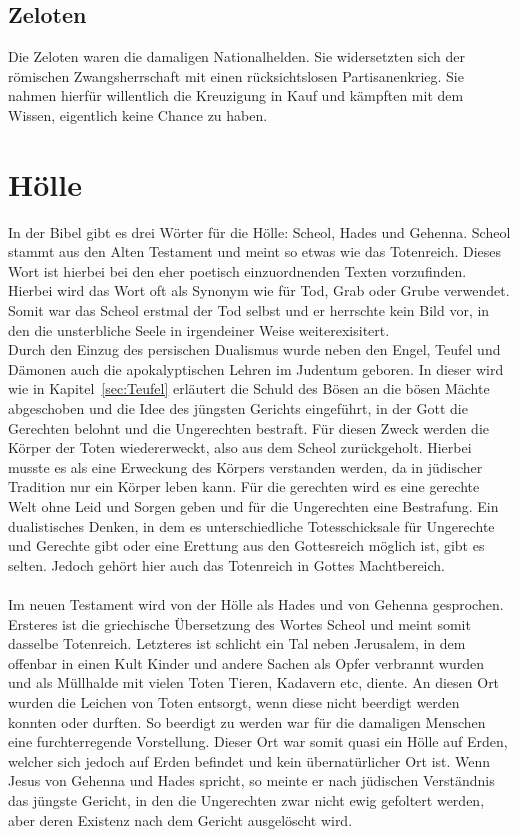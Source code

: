 \subsection{Zeloten}
Die Zeloten waren die damaligen Nationalhelden. Sie widersetzten sich der römischen Zwangsherrschaft mit einen rücksichtslosen Partisanenkrieg. Sie nahmen hierfür willentlich die Kreuzigung in Kauf und kämpften mit dem Wissen, eigentlich keine Chance zu haben.


\section{Hölle}
In der Bibel gibt es drei Wörter für die Hölle: Scheol, Hades und Gehenna. Scheol stammt aus den Alten Testament und meint so etwas wie das Totenreich.
Dieses Wort ist hierbei bei den eher poetisch einzuordnenden Texten vorzufinden. Hierbei wird das Wort oft als Synonym wie für Tod, Grab oder Grube verwendet.
Somit war das Scheol erstmal der Tod selbst und er herrschte kein Bild vor, in den die unsterbliche Seele in irgendeiner Weise weiterexisitert.
\\
Durch den Einzug des persischen Dualismus wurde neben den Engel, Teufel und Dämonen auch die apokalyptischen Lehren im Judentum geboren. In dieser
wird wie in Kapitel\ \ref{sec:Teufel} erläutert die Schuld des Bösen an die bösen Mächte abgeschoben und die Idee des jüngsten Gerichts eingeführt,
in der Gott die Gerechten belohnt und die Ungerechten bestraft. Für diesen Zweck werden die Körper der Toten wiedererweckt, also aus dem Scheol zurückgeholt.
Hierbei musste es als eine Erweckung des Körpers verstanden werden, da in jüdischer Tradition nur ein Körper leben kann. Für die gerechten
wird es eine gerechte Welt ohne Leid und Sorgen geben und für die Ungerechten eine Bestrafung. Ein dualistisches Denken, in dem es unterschiedliche Totesschicksale für Ungerechte und Gerechte gibt oder eine Erettung aus den Gottesreich möglich ist, gibt es selten.  Jedoch gehört hier auch das Totenreich in Gottes Machtbereich.
\\~\\
Im neuen Testament wird von der Hölle als Hades und von Gehenna gesprochen. Ersteres ist die griechische Übersetzung des Wortes Scheol und meint somit dasselbe Totenreich. Letzteres ist schlicht ein Tal neben Jerusalem, in dem offenbar in einen Kult Kinder und andere Sachen als Opfer verbrannt wurden und als Müllhalde mit vielen Toten Tieren, Kadavern etc, diente. An diesen Ort wurden die Leichen von Toten entsorgt, wenn diese nicht beerdigt werden konnten
oder durften. So beerdigt zu werden war für die damaligen Menschen eine furchterregende Vorstellung. Dieser Ort war somit quasi ein \glqq Hölle auf Erden\grqq{}, welcher sich jedoch auf Erden befindet und kein übernatürlicher Ort ist. Wenn Jesus von Gehenna und Hades spricht, so meinte er nach jüdischen Verständnis das jüngste Gericht, in den die Ungerechten zwar nicht ewig gefoltert werden, aber deren Existenz nach dem Gericht ausgelöscht wird.